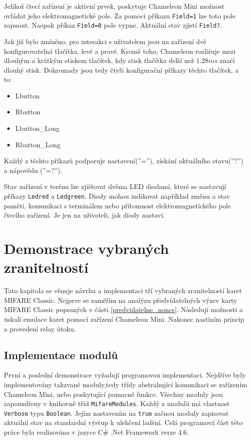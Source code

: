 Jelikož čtecí zařízení je aktivní prvek, poskytuje Chameleon Mini možnost ovládat jeho elektromagnetické pole. Za pomoci příkazu \verb|Field=1| lze toto pole zapnout. Naopak příkaz \verb|Field=0| pole vypne. Aktuální stav zjistí \verb|Field?|.\par
Jak již bylo zmíněno, pro interakci s uživatelem jsou na zařízení dvě konfigurovatelná tlačítka, levé a pravé. Kromě toho, Chameleon rozlišuje mezi dlouhým a krátkým stiskem tlačítek, kdy stisk tlačítka delší než $1.28ms$ značí dlouhý stisk. Dohromady jsou tedy čtyři konfigurační příkazy těchto tlačítek, a to:
\begin{itemize}
\item Lbutton
\item Rbutton
\item {Lbutton\_Long}
\item {Rbutton\_Long}
\end{itemize}
Každý z těchto příkazů podporuje nastavení(''=''), získání aktuálního stavu(''?'') a nápovědu (''=?''). \par
Stav zařízení v terénu lze zjišťovat dvěma LED diodami, které se nastavují příkazy \verb|Ledred| a \verb|Ledgreen|. Diody mohou indikovat například změnu a stav paměti, komunikaci s terminálem nebo přítomnost elektromagnetického pole čtecího zařízení. Je jen na uživateli, jak diody nastaví.\cite{ChameleonDocs}

    \chapter{Demonstrace vybraných zranitelností}
Tato kapitola se věnuje návrhu a implementaci tří vybraných zranitelností karet MIFARE Classic. Nejprve se zaměřím na analýzu předvídatelných výzev karty MIFARE Classic popsaných v části \ref{predvidatelne_nonce}. Následují možnosti a úskalí emulace karet pomocí zařízení Chameleon Mini. Nakonec nastíním princip a provedení relay útoku.\par 

\section{Implementace modulů}
\label{implementaceModulu}
První a poslední demonstrace vyžadují programovou implementaci. Nejdříve byly implementovány takzvané moduly,tedy třídy abstrahující komunikaci se zařízením Chameleon Mini, nebo poskytující pomocné funkce. Všechny moduly jsou zapouzdřeny v knihovně tříd \verb|MifareModules|. Každý z modulů má vlastnost \verb|Verbose| typu \verb|Boolean|. Jejím nastavením na \verb|true| začnou moduly zapisovat aktuální stav na standardní výstup k ulehčení ladění. Celá programová část této práce byla realizována v jazyce C\# .Net Framework verze 4.6.


